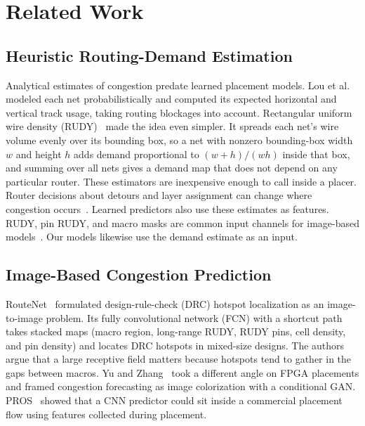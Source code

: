 \IfFileExists{./ieeeconf.cls}{\documentclass[9pt]{ieeeconf}}{\documentclass[conference]{IEEEtran}\usepackage[T1]{fontenc}}
\begin{document}
\section{Related Work}
\subsection{Heuristic Routing-Demand Estimation}
Analytical estimates of congestion predate learned placement models. Lou et al.~\cite{lou2002probabilistic} modeled each net probabilistically and computed its expected horizontal and vertical track usage, taking routing blockages into account. Rectangular uniform wire density (RUDY)~\cite{spindler2007rudy} made the idea even simpler. It spreads each net's wire volume evenly over its bounding box, so a net with nonzero bounding-box width \(w\) and height \(h\) adds demand proportional to \((w+h)/(wh)\) inside that box, and summing over all nets gives a demand map that does not depend on any particular router. These estimators are inexpensive enough to call inside a placer. Router decisions about detours and layer assignment can change where congestion occurs~\cite{xie2018routenet}. Learned predictors also use these estimates as features. RUDY, pin RUDY, and macro masks are common input channels for image-based models~\cite{xie2018routenet,liu2021global,chai2023circuitnet}. Our models likewise use the demand estimate as an input.

\subsection{Image-Based Congestion Prediction}
RouteNet~\cite{xie2018routenet} formulated design-rule-check (DRC) hotspot localization as an image-to-image problem. Its fully convolutional network (FCN) with a shortcut path takes stacked maps (macro region, long-range RUDY, RUDY pins, cell density, and pin density) and locates DRC hotspots in mixed-size designs. The authors argue that a large receptive field matters because hotspots tend to gather in the gaps between macros. Yu and Zhang~\cite{yu2019painting} took a different angle on FPGA placements and framed congestion forecasting as image colorization with a conditional GAN. PROS~\cite{chen2020pros} showed that a CNN predictor could sit inside a commercial placement flow using features collected during placement.
\end{document}
